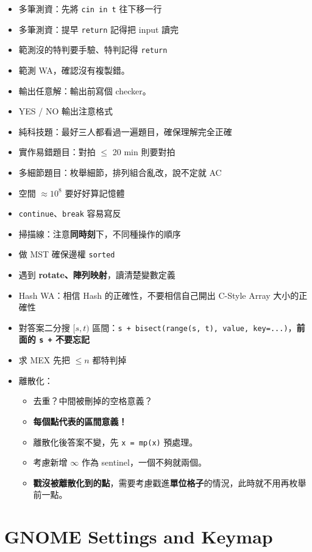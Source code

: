 \documentclass[10pt, a4paper, twocolumn]{article}
\begin{document}
\begin{itemize}[itemsep=0.1em, leftmargin=*]
  \item 多筆測資：先將 \texttt{cin in t} 往下移一行
  \item 多筆測資：提早 \texttt{return} 記得把 input 讀完
  \item 範測沒的特判要手驗、特判記得 \texttt{return}
  \item 範測 WA，確認沒有複製錯。
  \item 輸出任意解：輸出前寫個 checker。
  \item YES / NO 輸出注意格式
  \item 純科技題：最好三人都看過一遍題目，確保理解完全正確
  \item 實作易錯題目：對拍 $\le$ 20 min 則要對拍
  \item 多細節題目：枚舉細節，排列組合亂改，說不定就 AC
  \item 空間 $\approx 10 ^ 8$ 要好好算記憶體
  \item \texttt{continue}、\texttt{break} 容易寫反
  \item 掃描線：注意\textbf{同時刻}下，不同種操作的順序
  \item 做 MST 確保邊權 \texttt{sorted}
  \item 遇到 \textbf{rotate、陣列映射}，讀清楚變數定義
  \item Hash WA：相信 Hash 的正確性，不要相信自己開出 C-Style Array 大小的正確性
  \item 對答案二分搜 $[s, t)$ 區間：\texttt{s + bisect(range(s, t), value, key=...)}，\textbf{前面的 \texttt{s +} 不要忘記}
  \item 求 MEX 先把 $\le n$ 都特判掉
  \item 離散化：
  \begin{itemize}[itemsep=0.1em, leftmargin=*]
    \item 去重？中間被刪掉的空格意義？
    \item \textbf{每個點代表的區間意義！}
    \item 離散化後答案不變，先 \texttt{x = mp(x)} 預處理。
    \item 考慮新增 $\infty$ 作為 sentinel，一個不夠就兩個。
    \item \textbf{戳沒被離散化到的點}，需要考慮戳進\textbf{單位格子}的情況，此時就不用再枚舉前一點。
  \end{itemize}
\end{itemize}

\section{GNOME Settings and Keymap}
\end{document}
